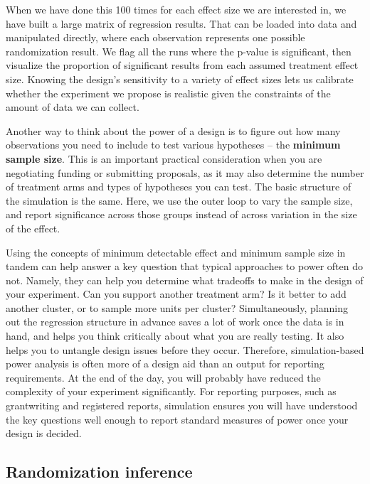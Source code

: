 When we have done this 100 times for each effect size we are interested in,
we have built a large matrix of regression results.
That can be loaded into data and manipulated directly,
where each observation represents one possible randomization result.
We flag all the runs where the p-value is significant,
then visualize the proportion of significant results
from each assumed treatment effect size.
Knowing the design's sensitivity to a variety of effect sizes
lets us calibrate whether the experiment we propose
is realistic given the constraints of the amount of data we can collect.

Another way to think about the power of a design
is to figure out how many observations you need to include
to test various hypotheses -- the \textbf{minimum sample size}.
This is an important practical consideration
when you are negotiating funding or submitting proposals,
as it may also determine the number of treatment arms
and types of hypotheses you can test.
The basic structure of the simulation is the same.
Here, we use the outer loop to vary the sample size,
and report significance across those groups
instead of across variation in the size of the effect.

Using the concepts of minimum detectable effect
and minimum sample size in tandem can help answer a key question
that typical approaches to power often do not.
Namely, they can help you determine what tradeoffs to make
in the design of your experiment.
Can you support another treatment arm?
Is it better to add another cluster,
or to sample more units per cluster?
Simultaneously, planning out the regression structure
in advance saves a lot of work once the data is in hand,
and helps you think critically about what you are really testing.
It also helps you to untangle design issues before they occur.
Therefore, simulation-based power analysis is often more of a design aid
than an output for reporting requirements.
At the end of the day, you will probably have reduced
the complexity of your experiment significantly.
For reporting purposes, such as grantwriting and registered reports,
simulation ensures you will have understood the key questions well enough
to report standard measures of power once your design is decided.

\subsection{Randomization inference}


